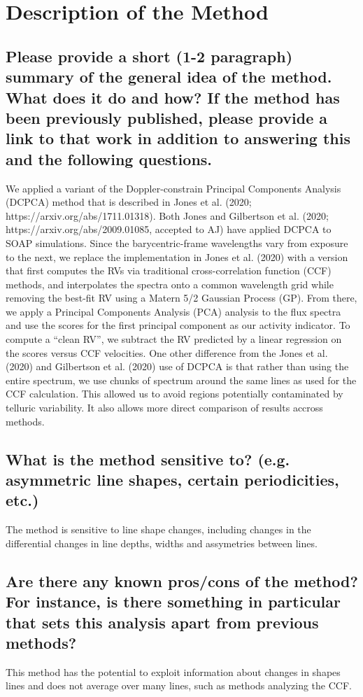 \documentclass[12pt]{article}
\begin{document}
\section{Description of the Method}
\subsection{Please provide a short (1-2 paragraph) summary of the general idea of the method.  What does it do and how?  If the method has been previously published, please provide a link to that work in addition to answering this and the following questions.}

We applied a variant of the Doppler-constrain Principal Components Analysis (DCPCA) method that is described in Jones et al. (2020; https://arxiv.org/abs/1711.01318).
Both Jones and Gilbertson et al. (2020; https://arxiv.org/abs/2009.01085, accepted to AJ) have applied DCPCA to SOAP simulations.
Since the barycentric-frame wavelengths vary from exposure to the next, we replace the implementation in Jones et al. (2020) with a version that first computes the RVs via traditional cross-correlation function (CCF) methods, and interpolates the spectra onto a common wavelength grid while removing the best-fit RV using a Matern 5/2 Gaussian Process (GP).
From there, we apply a Principal Components Analysis (PCA) analysis to the flux spectra and use the scores for the first principal component as our activity indicator.
To compute a ``clean RV'', we subtract the RV predicted by a linear regression on the scores versus CCF velocities.
One other difference from the Jones et al. (2020) and Gilbertson et al. (2020) use of DCPCA is that rather than using the entire spectrum, we use chunks of spectrum around the same lines as used for the CCF calculation.
This allowed us to avoid regions potentially contaminated by telluric variability.
It also allows more direct comparison of results accross methods.


\subsection{What is the method sensitive to? (e.g. asymmetric line shapes, certain periodicities, etc.)}
The method is sensitive to line shape changes, including changes in the differential changes in line depths, widths and assymetries between lines.

\subsection{Are there any known pros/cons of the method?  For instance, is there something in particular that sets this analysis apart from previous methods?}
This method has the potential to exploit information about changes in shapes lines and does not average over many lines, such as methods analyzing the CCF.
\end{document}
